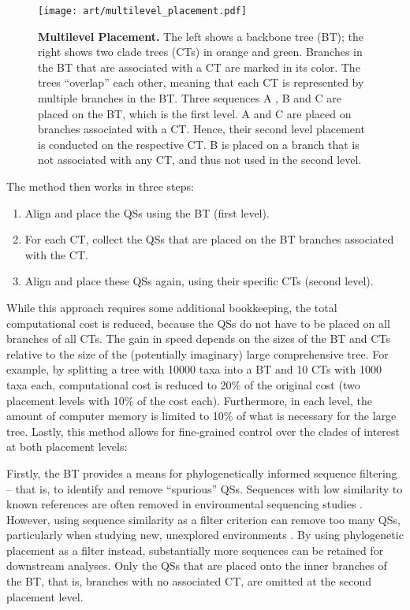 \begin{figure}[hpbt]
    \centering
    \texttt{[image: art/multilevel\_placement.pdf]}
    \caption{
        \textbf{Multilevel Placement.}
        The left shows a backbone tree (BT); the right shows two clade trees (CTs) in orange and green.
        Branches in the BT that are associated with a CT are marked in its color.
        The trees ``overlap'' each other, meaning that each CT is represented by multiple branches in the BT.
        Three sequences {\sffamily A} , {\sffamily B} and {\sffamily C} are placed on the BT, which is the first level.
        {\sffamily A} and {\sffamily C} are placed on branches associated with a CT.
        Hence, their second level placement is conducted on the respective CT.
        {\sffamily B} is placed on a branch that is not associated with any CT,
        and thus not used in the second level.
    }
    \label{fig:multilevel_placement}
\end{figure}

The method then works in three steps:

\begin{enumerate}
    \item Align and place the \acp{QS} using the \ac{BT} (first level).
    \item For each \ac{CT}, collect the \acp{QS} that are placed on the \ac{BT} branches associated with the \ac{CT}.
    \item Align and place these \acp{QS} again, using their specific \acp{CT} (second level).
\end{enumerate}

While this approach requires some additional bookkeeping,
the total computational cost is reduced,
because the \acp{QS} do not have to be placed on all branches of all \acp{CT}.
The gain in speed depends on the sizes of the \ac{BT} and \acp{CT}
relative to the size of the (potentially imaginary) large comprehensive tree.
For example, by splitting a tree with \num{10 000} taxa into a \ac{BT} and \num{10} \acp{CT} with 1000 taxa each,
computational cost is reduced to 20\% of the original cost (two placement levels with 10\% of the cost each).
Furthermore, in each level, the amount of computer memory is limited to 10\% of what is necessary for the large tree.
Lastly, this method allows for fine-grained control over the clades of interest at both placement levels:

Firstly, the \ac{BT} provides a means for phylogenetically informed sequence filtering --
that is, to identify and remove ``spurious'' \acp{QS}.
Sequences with low similarity to known references are often removed in environmental sequencing studies \citep{Stoeck2010}.
However, using sequence similarity as a filter criterion can remove too many \acp{QS},
particularly when studying new, unexplored environments \citep{Mahe2017}.
By using phylogenetic placement as a filter instead, substantially more sequences can be retained for downstream analyses.
Only the \acp{QS} that are placed onto the inner branches of the \ac{BT},
that is, branches with no associated \ac{CT},
are omitted at the second placement level.


